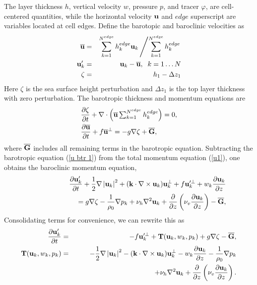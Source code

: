 \documentclass[11pt]{report}
\newcommand{\ds}{\displaystyle}
\begin{document}
The layer thickness $h$, vertical velocity $w$, pressure $p$, and tracer $\varphi$, are cell-centered quantities, while the horizontal velocity ${\bf u}$ and $edge$ superscript are variables located at cell edges.
Define the barotopic and baroclinic velocities as 
\newcommand{\utot}{{\bf u}_k}
\newcommand{\ubtr}{ \overline{\bf u}}
\newcommand{\ubcl}{ {\bf u}'_k}
\begin{eqnarray}
\ubtr &=&  \sum_{k=1}^{N^{edge}} h_k^{edge} \utot 
\left/\sum_{k=1}^{N^{edge}} h_k^{edge} 
\right.\\ 
\ubcl &=& \utot-\ubtr, \;\; k=1\ldots N \\
\zeta &=& h_1 - \Delta z_1
\end{eqnarray}
Here $\zeta$ is the sea surface height perturbation and $\Delta z_1$ is the top layer thickness with zero perturbation.  The barotropic thickness and momentum equations are
\begin{eqnarray}   
\label{h btr 1}
& \displaystyle
 \frac{\partial \zeta}{\partial t} 
 + \nabla \cdot \left( \ubtr \textstyle\sum_{k=1}^{N^{edge}} h_k^{edge} \right) 
= 0, \\
\label{u btr 1}
& \displaystyle
 \frac{\partial \ubtr}{\partial t} 
+ f\ubtr^{\perp}
  = - g\nabla \zeta
+ {\overline {\bf G}},
\end{eqnarray}
where ${\overline {\bf G}}$ includes all remaining terms in the barotropic equation.  Subtracting the barotropic equation (\ref{u btr 1}) from the total momentum equation (\ref{u1}), one obtains the baroclinic momentum equation,
\begin{eqnarray}   
\label{u bcl 1}
&&\frac{\partial \ubcl}{\partial t} 
+ \frac{1}{2}\nabla \left| \utot \right|^2 
+ ( {\bf k} \cdot \nabla \times \utot) \utot^\perp 
+ f{\bf u}'^{\perp}_k 
+ w_k\frac{\partial \utot}{\partial z}
\\ && \hspace{2cm}
  =  g\nabla \zeta  
- \frac{1}{\rho_0}\nabla p_k  
   +\nu_h\nabla^2\utot
 + \frac{\partial }{\partial z} 
\left( \nu_v \frac{\partial \utot}{\partial z} \right) -{\overline {\bf G}},
\end{eqnarray}
Consolidating terms for convenience, we can rewrite this as
\begin{eqnarray}   
\label{u bcl 2}
\frac{\partial \ubcl}{\partial t} 
&=& -f{\bf u}'^{\perp}_k + {\bf T}({\bf u}_{k},w_k,p_{k}) +g\nabla \zeta  -{\overline {\bf G}},\\
{\bf T}({\bf u}_{k},w_k, p_{k}) &=& \ds
- \frac{1}{2}\nabla \left| \utot \right|^2 
- ( {\bf k} \cdot \nabla \times \utot) \utot^\perp
- w_k\frac{\partial \utot}{\partial z}
- \frac{1}{\rho_0}\nabla p_k  \\ && \nonumber \hspace{4cm}
   +\nu_h\nabla^2\utot
 + \frac{\partial }{\partial z} 
\left( \nu_v \frac{\partial \utot}{\partial z} \right).
\end{eqnarray}
\end{document}
